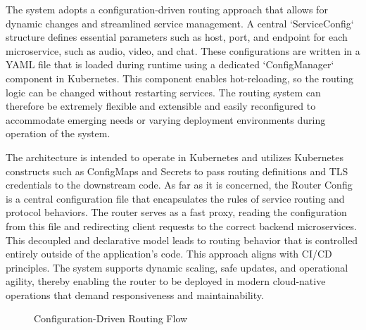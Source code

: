The system adopts a configuration-driven routing approach that allows for dynamic changes and streamlined service management. A central `ServiceConfig` structure defines essential parameters such as host, port, and endpoint for each microservice, such as audio, video, and chat. These configurations are written in a YAML file that is loaded during runtime using a dedicated `ConfigManager` component in Kubernetes. This component enables hot-reloading, so the routing logic can be changed without restarting services. The routing system can therefore be extremely flexible and extensible and easily reconfigured to accommodate emerging needs or varying deployment environments during operation of the system.

The architecture is intended to operate in Kubernetes and utilizes Kubernetes constructs such as ConfigMaps and Secrets to pass routing definitions and TLS credentials to the downstream code. As far as it is concerned, the Router Config is a central configuration file that encapsulates the rules of service routing and protocol behaviors. The router serves as a fast proxy, reading the configuration from this file and redirecting client requests to the correct backend microservices. This decoupled and declarative model leads to routing behavior that is controlled entirely outside of the application's code. This approach aligns with CI/CD principles. The system supports dynamic scaling, safe updates, and operational agility, thereby enabling the router to be deployed in modern cloud-native operations that demand responsiveness and maintainability.


\begin{figure}[h]
\centering
{}
\caption{Configuration-Driven Routing Flow}
\label{fig:config_routing}
\end{figure}

